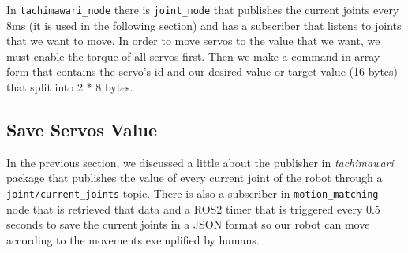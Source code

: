   
  In \verb|tachimawari_node| there is \verb|joint_node| that publishes the current joints every 8ms (it is used in the following section) and has a subscriber that listens to joints that we want to move. 
  In order to move servos to the value that we want, we must enable the torque of all servos first. Then we make a command in array form that contains the servo's id and our desired value or target value (16 bytes) that split into 2 * 8 bytes.


\subsection{Save Servos Value}
\label{subsec:save-servo-value}

In the previous section, we discussed a little about the publisher in \emph{tachimawari} package that publishes the value of every current joint of the robot through a \verb|joint/current_joints| topic.
There is also a subscriber in \verb|motion_matching| node that is retrieved that data and a ROS2 timer that is triggered every 0.5 seconds to save the current joints in a JSON format so our robot can move according to the movements exemplified by humans.


